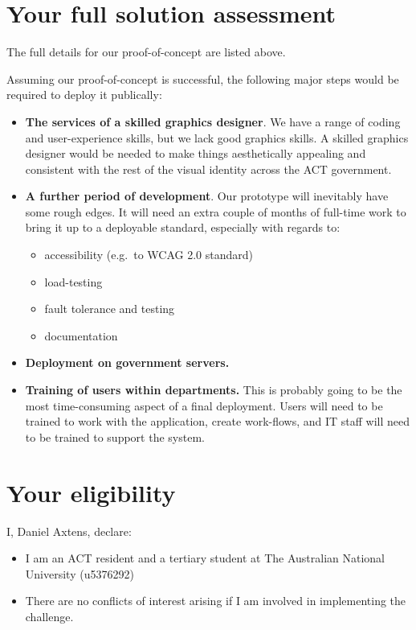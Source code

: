 \documentclass[12pt]{article}
\begin{document}
\section{Your full solution assessment}

The full details for our proof-of-concept are listed above.

Assuming our proof-of-concept is successful, the following major steps
would be required to deploy it publically:
\begin{itemize}
\item \textbf{The services of a skilled graphics designer}. We
  have a range of coding and user-experience skills, but we lack good
  graphics skills. A skilled graphics designer would be needed to make
  things aesthetically appealing and consistent with the rest of the
  visual identity across the ACT government. 
\item \textbf{A further period of development}. Our prototype will
  inevitably have some rough edges. It will need an extra couple of
  months of full-time work to bring it up to a deployable standard,
  especially with regards to:
  \begin{itemize}
  \item accessibility (e.g.~to WCAG 2.0 standard)
  \item load-testing 
  \item fault tolerance and testing 
  \item documentation
  \end{itemize}
\item \textbf{Deployment on government servers.}
\item \textbf{Training of users within departments.} This is probably
  going to be the most time-consuming aspect of a final
  deployment. Users will need to be trained to work with the
  application, create work-flows, and IT staff will need to be trained
  to support the system.
\end{itemize}

\newpage
\section{Your eligibility}

I, Daniel Axtens, declare:
\begin{itemize}
\item I am an ACT resident and a tertiary student at The
  Australian National University (u5376292) \item There are no
  conflicts of interest arising if I am involved in implementing the
  challenge.
\end{itemize}
\end{document}

